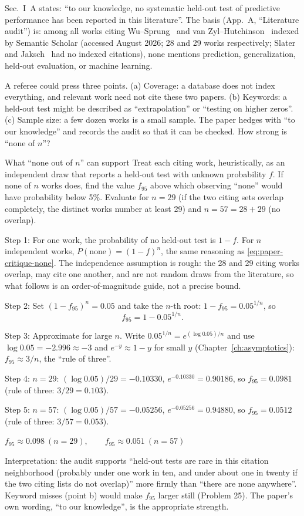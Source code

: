 Sec.~I~A states: ``to our knowledge, no systematic held-out test of predictive performance has been reported in this literature''. The basis (App.~A, ``Literature audit'') is: among all works citing Wu--Sprung~\cite{wusprung} and van Zyl--Hutchinson~\cite{vanzyl} indexed by Semantic Scholar (accessed August 2026; 28 and 29 works respectively; Slater~\cite{slater} and Jaksch~\cite{jaksch} had no indexed citations), none mentions prediction, generalization, held-out evaluation, or machine learning.

A referee could press three points. (a) Coverage: a database does not index everything, and relevant work need not cite these two papers. (b) Keywords: a held-out test might be described as ``extrapolation'' or ``testing on higher zeros''. (c) Sample size: a few dozen works is a small sample. The paper hedges with ``to our knowledge'' and records the audit so that it can be checked. How strong is ``none of $n$''?

\begin{sample}{What ``none out of $n$'' can support}
Treat each citing work, heuristically, as an independent draw that reports a held-out test with unknown probability $f$. If none of $n$ works does, find the value $f_{95}$ above which observing ``none'' would have probability below 5\%. Evaluate for $n=29$ (if the two citing sets overlap completely, the distinct works number at least 29) and $n=57=28+29$ (no overlap).

Step 1: For one work, the probability of no held-out test is $1-f$. For $n$ independent works, $P(\text{none})=(1-f)^n$, the same reasoning as \eqref{eq:paper-critique-none}. The independence assumption is rough: the 28 and 29 citing works overlap, may cite one another, and are not random draws from the literature, so what follows is an order-of-magnitude guide, not a precise bound.

Step 2: Set $(1-f_{95})^n=0.05$ and take the $n$-th root: $1-f_{95}=0.05^{1/n}$, so
\begin{equation}
f_{95}=1-0.05^{1/n}.
\label{eq:paper-critique-rule3}
\end{equation}

Step 3: Approximate for large $n$. Write $0.05^{1/n}=e^{(\log 0.05)/n}$ and use $\log0.05=-2.996\approx-3$ and $e^{-y}\approx1-y$ for small $y$ (Chapter~\ref{ch:asymptotics}): $f_{95}\approx 3/n$, the ``rule of three''.

Step 4: $n=29$: $(\log0.05)/29=-0.10330$, $e^{-0.10330}=0.90186$, so $f_{95}=0.0981$ (rule of three: $3/29=0.103$).

Step 5: $n=57$: $(\log0.05)/57=-0.05256$, $e^{-0.05256}=0.94880$, so $f_{95}=0.0512$ (rule of three: $3/57=0.053$).

$\boxed{f_{95}\approx0.098\ (n=29),\qquad f_{95}\approx0.051\ (n=57)}$

Interpretation: the audit supports ``held-out tests are rare in this citation neighborhood (probably under one work in ten, and under about one in twenty if the two citing lists do not overlap)'' more firmly than ``there are none anywhere''. Keyword misses (point b) would make $f_{95}$ larger still (Problem 25). The paper's own wording, ``to our knowledge'', is the appropriate strength.
\end{sample}

